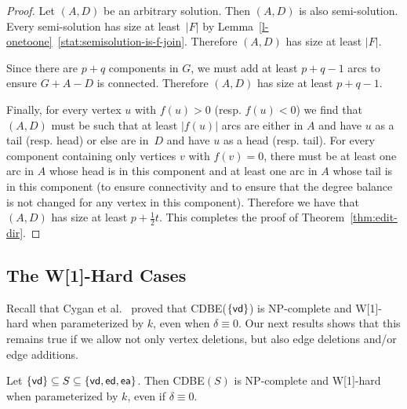 \documentclass[11pt]{llncs}
\newcommand{\vd}{{\sf vd}}
\newcommand{\ed}{{\sf ed}}
\newcommand{\ea}{{\sf ea}}
\newcommand{\cdbe}{{\sc CDBE}}
\newcommand{\NP}{{\sf NP}}
\newcommand{\W}{{\sf W[1]}}
\begin{document}
\begin{proof}
Let $(A,D)$ be an arbitrary solution. Then $(A,D)$ is also semi-solution. Every
semi-solution has size at least~$|F|$ by Lemma~\ref{l-onetoone}~\ref{stat:semisolution-is-f-join}. Therefore
$(A,D)$ has size at least $|F|$.

Since there are $p+q$ components in $G$, we must add at least $p+q-1$ arcs to
ensure $G+A-D$ is connected.  Therefore $(A,D)$ has size at least $p+q-1$. 

Finally, for every vertex $u$ with $f(u)>0$
(resp. $f(u)<0$) we find that $(A,D)$ must be such that at least $|f(u)|$ arcs
are either in $A$ and have $u$ as a tail (resp. head) or else are in~$D$ and
have $u$ as a head (resp. tail). For every component containing only vertices
$v$ with $f(v)=0$, there must be at least one arc in $A$ whose head is in this
component and at least one arc in $A$ whose tail is in this component (to
ensure connectivity and to ensure that the degree balance is not changed for any
vertex in this component).  Therefore we have that $(A,D)$ has size at least
$p+\frac{1}{2}t$. This completes the proof of Theorem~\ref{thm:edit-dir}.
\end{proof}


\subsection{The \W-Hard Cases}\label{s-wund}

Recall that Cygan et al.~\cite{CyganMPPS14} proved that \cdbe($\{\vd\}$) is
\NP-complete and \W-hard when parameterized by $k$, even when
$\delta\equiv 0$. Our next results shows that this remains true if we allow not
only vertex deletions, but also edge deletions and/or edge additions.

\begin{sloppypar}
\begin{theorem}\label{thm:vertex-dir}
Let $\{\vd\} \subseteq  S\subseteq \{\vd,\ed,\ea\}$. Then \cdbe$(S)$ is
\NP-complete and \W-hard when parameterized by $k$, even if
$\delta\equiv 0$.
\end{theorem}
\end{sloppypar}
\end{document}
